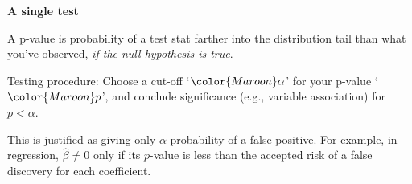 \documentclass[11pt,xcolor=svgnames]{beamer}
\newcommand{\theme}{\color{Maroon}}
\newcommand{\bk}{\color{black}}
\newcommand{\gr}{\color{gray}}
\newcommand{\sg}{\color{DarkSlateGray}}
\newcommand{\nv}{\color{Navy}}
\newcommand{\sk}{\vspace{.5cm}}
\begin{document}
\begin{frame}

{\bf A single test}

\sk
{A p-value is  probability of a test
stat farther into the distribution tail than what you've observed, {\it if the null hypothesis is true}.}

\sk
{\nv Testing procedure:}
Choose a cut-off `$\theme \alpha$' for your p-value `$\theme p$', and conclude
significance (e.g., variable association) for {\theme$p<\alpha$}.

\sk
This is justified as giving only $\alpha$ probability of a 
  false-positive.
{\sg  For example, in regression, 
$\hat\beta \neq 0$ only if its $p$-value is less than the accepted
risk of a false discovery for each coefficient.}

\end{frame}









\end{document}
